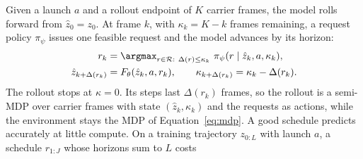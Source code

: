 Given a launch $a$ and a rollout endpoint of $K$ carrier frames, the model rolls forward from $\hat z_0=z_0$. At frame $k$, with $\kappa_k=K-k$ frames remaining, a request policy $\pi_\psi$ issues one feasible request and the model advances by its horizon:
\begin{align}
r_k&=\argmax_{r\in\mathcal{R}:\ \Delta(r)\le\kappa_k}\ \pi_\psi(r\mid\hat z_k,a,\kappa_k),
\label{eq:policy}\\
\hat z_{k+\Delta(r_k)}&=F_\theta(\hat z_k,a,r_k),\qquad \kappa_{k+\Delta(r_k)}=\kappa_k-\Delta(r_k).
\label{eq:rollout}
\end{align}
The rollout stops at $\kappa=0$. Its steps last $\Delta(r_k)$ frames, so the rollout is a semi-MDP over carrier frames with state $(\hat z_k,\kappa_k)$ and the requests as actions, while the environment stays the MDP of Equation~\ref{eq:mdp}. A good schedule predicts accurately at little compute. On a training trajectory $z_{0:L}$ with launch $a$, a schedule $r_{1:J}$ whose horizons sum to $L$ costs
